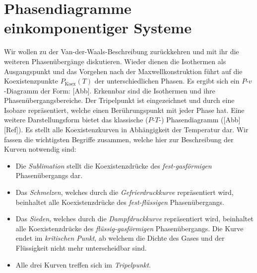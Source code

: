 \section{Phasendiagramme einkomponentiger Systeme}
Wir wollen zu der Van-der-Waals-Beschreibung zurückkehren und mit ihr die weiteren Phasenübergänge diskutieren.
Wieder dienen die Isothermen als Ausgangspunkt und das Vorgehen nach der Maxwellkonstruktion führt auf die Koexistenzpunkte $P_\mathrm{Koex}(T)$ der unterschiedlichen Phasen.
Es ergibt sich ein $P$-$v$-Diagramm der Form: [Abb].
Erkennbar sind die Isothermen und ihre Phasenübergangsbereiche. Der Tripelpunkt ist eingezeichnet und durch eine Isobare repräsentiert, welche einen Berührungspunkt mit jeder Phase hat. 
Eine weitere Darstellungsform bietet das klassische ($P$-$T$-) Phasendiagramm ([Abb][Ref]). Es stellt alle Koexistenzkurven in Abhängigkeit der Temperatur dar. Wir fassen die wichtigsten Begriffe zusammen, welche hier zur Beschreibung der Kurven notwendig sind:
\begin{itemize}
    \item Die \emph{Sublimation} stellt die Koexistenzdrücke des \emph{fest-gasförmigen} Phasenübergangs dar.
    \item Das \emph{Schmelzen}, welches durch die \emph{Gefrierdruckkurve} repräsentiert wird, beinhaltet alle Koexistenzdrücke des \emph{fest-flüssigen} Phasenübergangs.
    \item Das \emph{Sieden}, welches durch die \emph{Dampfdruckkurve} repräsentiert wird, beinhaltet alle Koexistenzdrücke des \emph{flüssig-gasförmigen} Phasenübergangs. Die Kurve endet im \emph{kritischen Punkt}, ab welchem die Dichte des Gases und der Flüssigkeit nicht mehr unterscheidbar sind.
    \item Alle drei Kurven treffen sich im \emph{Tripelpunkt}.
\end{itemize}
